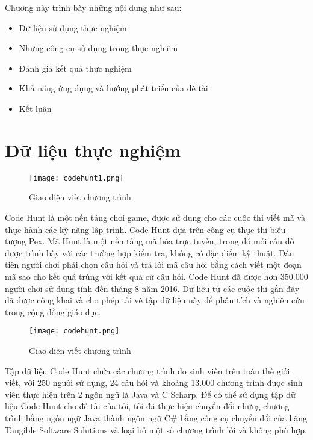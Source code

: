 Chương này trình bày những nội dung như sau:
\begin{itemize}
	\item Dữ liệu sử dụng thực nghiệm
	\item Những công cụ sử dụng trong thực nghiệm
	\item Đánh giá kết quả thực nghiệm
	\item Khả năng ứng dụng và hướng phát triển của đề tài
	\item Kết luận
\end{itemize}

\section{Dữ liệu thực nghiệm}
\label{sec:data}
\begin{center}
	\begin{figure}[htp]
		\begin{center}
			\texttt{[image: codehunt1.png]}
		\end{center}
		\caption{Giao diện viết chương trình}
		\label{refhinh1}
	\end{figure}
\end{center}

Code Hunt \cite{CodeHunt} là một nền tảng chơi game, được sử dụng cho các cuộc thi viết mã và thực hành các kỹ năng lập trình. Code Hunt dựa trên công cụ thực thi biểu tượng Pex. Mã Hunt là một nền tảng mã hóa trực tuyến, trong đó mỗi câu đố được trình bày với các trường hợp kiểm tra, không có đặc điểm kỹ thuật. Đầu tiên người chơi phải chọn câu hỏi và trả lời mã câu hỏi bằng cách viết một đoạn mã sao cho kết quả trùng với kết quả cử câu hỏi. Code Hunt đã được hơn 350.000 người chơi sử dụng tính đến tháng 8 năm 2016. Dữ liệu từ các cuộc thi gần đây đã được công khai và cho phép tải về tập dữ liệu này để phân tích và nghiên cứu trong cộng đồng giáo dục.

\begin{center}
	\begin{figure}[htp]
		\begin{center}
			\texttt{[image: codehunt.png]}
		\end{center}
		\caption{Giao diện viết chương trình}
		\label{refhinh1}
	\end{figure}
\end{center}

Tập dữ liệu Code Hunt chứa các chương trình do sinh viên trên toàn thế giới viết, với 250 người sử dụng, 24 câu hỏi và khoảng 13.000 chương trình được sinh viên thực hiện trên 2 ngôn ngữ là Java và C Scharp. Để có thể sử dụng tập dữ liệu Code Hunt cho đề tài của tôi, tôi đã thực hiện chuyển đổi những chương trình bằng ngôn ngữ Java thành ngôn ngữ C\#  bằng công cụ chuyển đổi của hãng Tangible Software Solutions và loại bỏ một số chương trình lỗi và không phù hợp.


